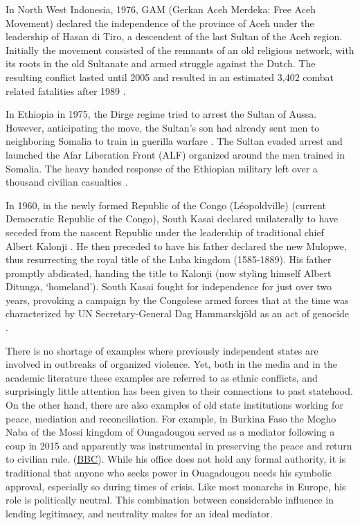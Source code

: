 In North West Indonesia, 1976, GAM (Gerkan Aceh Merdeka: Free Aceh Movement)
declared the independence of the province of Aceh under the leadership of Hasan
di Tiro, a descendent of the last Sultan of the Aceh region. Initially the
movement consisted of the remnants of an old religious network, with its roots
in the old Sultanate and armed struggle against the Dutch. The resulting
conflict lasted until 2005 and resulted in an estimated 3,402 combat related
fatalities after 1989 \citep{Aspinall2009, Pettersson2018, Sundberg2013}.

In Ethiopia in 1975, the Dirge regime tried to arrest the Sultan of Aussa. However,
anticipating the move, the Sultan's son had already sent men to neighboring
Somalia to train in guerilla warfare \citep{Shehim1985}. The Sultan evaded
arrest and launched the Afar Liberation Front (ALF) organized around the men
trained in Somalia. The heavy handed response of the Ethiopian military left
over a thousand civilian casualties \citep{UCDPconflict363}.

In 1960, in the newly formed Republic of the Congo (Léopoldville) (current
Democratic Republic of the Congo), South Kasai declared unilaterally to have
seceded from the nascent Republic under the leadership of traditional chief
Albert Kalonji \citep{Nzongola2002}. He then preceded to have his father
declared the new Mulopwe, thus resurrecting the royal title of the Luba kingdom
(1585-1889). His father promptly abdicated, handing the title to Kalonji (now
styling himself Albert Ditunga, `homeland'). South Kasai fought for independence
for just over two years, provoking a campaign by the Congolese armed forces that
at the time was characterized by UN Secretary-General Dag Hammarskjöld as an act
of genocide \citep{Nzongola2002}.

There is no shortage of examples where previously independent states are
involved in outbreaks of organized violence. Yet, both in the media and in the
academic literature these examples are referred to as ethnic conflicts, and
surprisingly little attention has been given to their connections to past
statehood. On the other hand, there are also examples of old state institutions
working for peace, mediation and reconciliation. For example, in Burkina Faso
the Mogho Naba of the Mossi kingdom of Ouagadougou served as a mediator
following a coup in 2015 and apparently was instrumental in preserving the
peace and return to civilian rule.
(\href{https://www.bbc.com/news/world-africa-34340704}{BBC}). While his office
does not hold any formal authority, it is traditional that anyone who seeks
power in Ouagadougou needs his symbolic approval, especially so during times of
crisis. Like most monarchs in Europe, his role is politically neutral. This
combination between considerable influence in lending legitimacy, and neutrality
makes for an ideal mediator.

